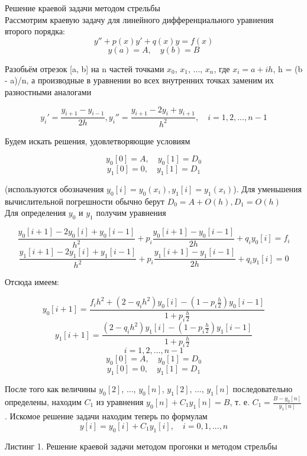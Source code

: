 \documentclass [12pt]{article}
\begin{document}
Решение краевой задачи методом стрельбы\\
Рассмотрим краевую задачу для линейного дифференциального уравнения второго порядка:
$$y'' + p(x)y' + q(x)y = f(x)$$
$$y(a) = A, \quad y(b) = B$$

Разобьём отрезок [a, b] на n частей точками $x_0$, $x_1$, ..., $x_n$, где $x_i = a + ih$, h = (b - a)/n, а производные в уравнении во всех внутренних точках заменим их разностными аналогами

$$y_i' = \frac{y_{i + 1} - y_{i - 1}}{2h}, y_i'' = \frac{y_{i + 1} - 2y_i + y_{i + 1}}{h^2}, \quad i = 1, 2, ..., n - 1$$

Будем искать решения, удовлетворяющие условиям

$$y_0[0] = A, \quad y_0[1] = D_0$$
$$y_1[0] = 0, \quad y_1[1] = D_1$$

(используются обозначения $y_0[i] = y_0(x_i), y_1[i] = y_1(x_i)$). Для уменьшения вычислительной погрешности обычно берут $D_0 = A + O(h), D_1 = O(h)$\\

Для определения $y_0$ и $y_1$ получим уравнения

$$\frac{y_0[i + 1] - 2y_0[i] + y_0[i - 1]}{h^2} + p_i\frac{y_0[i + 1] - y_0[i - 1]}{2h} + q_iy_0[i] = f_i$$
$$\frac{y_1[i + 1] - 2y_1[i] + y_1[i - 1]}{h^2} + p_i\frac{y_1[i + 1] - y_1[i - 1]}{2h} + q_iy_1[i] = 0$$

Отсюда имеем:

$$y_0[i + 1] = \frac{f_ih^2 + (2 - q_ih^2)y_0[i] - (1 - p_i\frac{h}{2})y_0[i - 1]}{1 + p_i\frac{h}{2}}$$
$$y_1[i + 1] = \frac{(2 - q_ih^2)y_1[i] - (1 - p_i\frac{h}{2})y_1[i - 1]}{1 + p_i\frac{h}{2}}$$
$$i = 1, 2, ..., n - 1$$
$$y_0[0] = A, \quad y_0[1] = D_0$$
$$y_1[0] = 0, \quad y_1[1] = D_1$$

После того как величины $y_0[2]$, ..., $y_0[n]$, $y_1[2]$, ..., $y_1[n]$ последовательно определены, находим $C_1$ из уравнения $y_0[n] + C_1y_1[n] = B$, т. е. $C_1 = \frac{B - y_0[n]}{y_1[n]}$. Искомое решение задачи находим теперь по формулам
$$y[i] = y_0[i] + C_1y_1[i], \quad i = 0, 1, ..., n$$

Листинг 1. Решение краевой задачи методом прогонки и методом стрельбы
\end{document}
